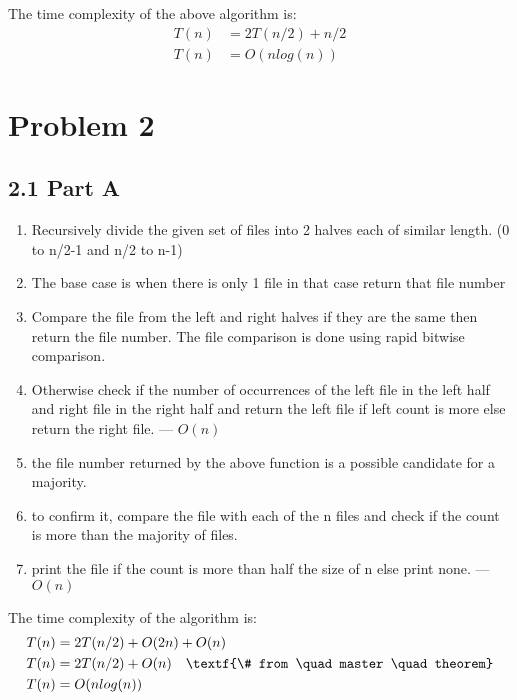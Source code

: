 \documentclass[12pt]{article}
\begin{document}
The time complexity of the above algorithm is: 
\begin{equation}
\begin{aligned}
\nonumber
T(n)&=2T(n/2)+n/2 \\
T(n)&=O(nlog(n))
\end{aligned}
\end{equation}


\section*{Problem 2}


\subsection*{2.1 Part A} 

\vspace{10pt}
\begin{enumerate}
\item Recursively divide the given set of files into 2 halves each of similar length. (0 to n/2-1 and n/2 to n-1) 
\item The base case is when there is only 1 file in that case return that file number
\item Compare the file from the left and right halves if they are the same then return the file number. The file comparison is done using rapid bitwise comparison.  
\item Otherwise check if the number of occurrences of the left file in the left half and right file in the right half and return the left file if left count is more else return the right file. --- $O(n)$
\item the file number returned by the above function is a possible candidate for a majority. 
\item to confirm it, compare the file with each of the n files and check if the count is more than the majority of files.
\item print the file if the count is more than half the size of n else print none. --- $O(n)$ 
\end{enumerate}

The time complexity of the algorithm is: 
\begin{equation}
\begin{aligned}
\nonumber
T(n)&=2T(n/2)+O(2n)+O(n) \\
T(n)&=2T(n/2)+O(n) \quad \textf{\# from \quad master \quad theorem} \\
T(n)&=O(nlog(n))
\end{aligned}
\end{equation}
\end{document}
